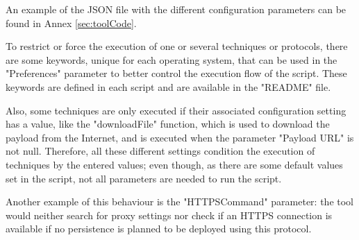 
An example of the JSON file with the different configuration parameters can be found in Annex \ref{sec:toolCode}.

\pagebreak
To restrict or force the execution of one or several techniques or protocols, there are some keywords, unique for each operating system, that can be used in the "Preferences" parameter to better control the execution flow of the script. These keywords are defined in each script and are available in the "README" file.

Also, some techniques are only executed if their associated configuration setting has a value, like the "downloadFile" function, which is used to download the payload from the Internet, and is executed when the parameter "Payload URL" is not null. Therefore, all these different settings condition the execution of techniques by the entered values; even though, as there are some default values set in the script, not all parameters are needed to run the script.

Another example of this behaviour is the "HTTPSCommand" parameter: the tool would neither search for proxy settings nor check if an HTTPS connection is available if no persistence is planned to be deployed using this protocol. 


